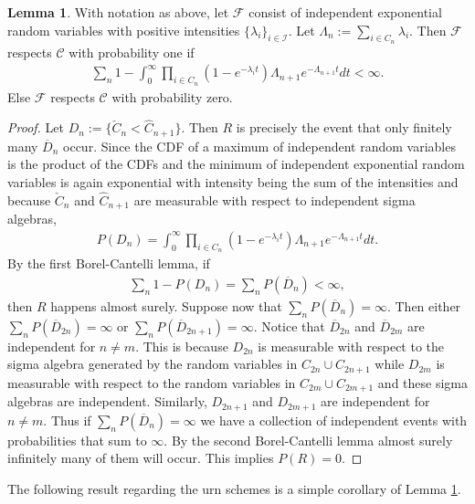 \documentclass[12pt]{article}
\theoremstyle{definition}
\newtheorem{lemma}[proposition]{Lemma}
\begin{document}
\begin{lemma}\label{respect} With notation as above,
    let $\mathcal{F}$ consist of independent exponential random variables with positive intensities $\{\lambda_i\}_{i \in \mathcal{I}}$. Let $\Lambda_ n := \sum_{i \in C_n} \lambda_i$. Then $\mathcal{F}$ respects $\mathcal{C}$ with probability one if
    \begin{align*}
        \sum_n 1-\int_0^\infty \prod_{i \in C_n}(1-e^{-\lambda_it}) \Lambda_{n+1}e^{-\Lambda_{n+1}t}dt < \infty.
    \end{align*} Else $\mathcal{F}$ respects $\mathcal{C}$ with probability zero.
\end{lemma}
\begin{proof}
    Let $D_n := \{\check{C}_n < \hat{C}_{n+1}\}$. Then $R$ is precisely the event that only finitely many $\overline{D}_n$ occur. Since the CDF of a maximum of independent random variables is the product of the CDFs and the minimum of independent exponential random variables is again exponential with intensity being the sum of the intensities and because $\check{C}_n$ and $\hat{C}_{n+1}$ are measurable with respect to independent sigma algebras,
    \begin{align*}
        P(D_n) =  \int_0^\infty \prod_{i \in C_n}(1-e^{-\lambda_it}) \Lambda_{n+1}e^{-\Lambda_{n+1}t}dt.
    \end{align*}
    By the first Borel-Cantelli lemma, if \begin{align*}
        \sum_n 1-P(D_n) = \sum_n P(\overline{D}_n) < \infty,
    \end{align*}
    then $R$ happens almost surely. Suppose now that $\sum_n P(\overline{D}_n) = \infty$. Then either $\sum_{n}P(\overline{D}_{2n}) = \infty$ or $\sum_n P(\overline{D}_{2n+1}) = \infty$. Notice that $\overline{D}_{2n}$ and $\overline{D}_{2m}$ are independent for $n \neq m$. This is because $D_{2n}$ is measurable with respect to the sigma algebra generated by the random variables in $C_{2n} \cup C_{2n+1}$ while $D_{2m}$ is measurable with respect to the random variables in $C_{2m} \cup C_{2m+1}$ and these sigma algebras are independent. Similarly, $D_{2n+1}$ and $D_{2m+1}$ are independent for $n \neq m$. Thus if $\sum_n P(\overline{D}_n) = \infty$ we have a collection of independent events with probabilities that sum to $\infty$. By the second Borel-Cantelli lemma almost surely infinitely many of them will occur. This implies $P(R) = 0$.
\end{proof}


The following result regarding the urn schemes is a simple corollary of Lemma \ref{respect}.
\end{document}
